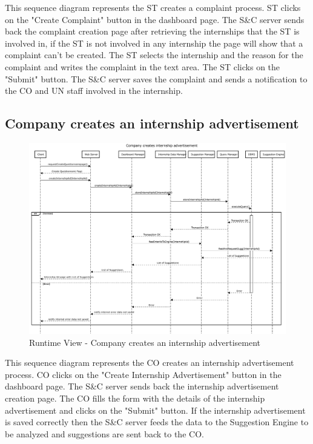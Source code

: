 \par This sequence diagram represents the ST creates a complaint process. ST clicks on the "Create Complaint" button in the
dashboard page. The S\&C server sends back the complaint creation page after retrieving the internships that the ST is involved in, 
if the ST is not involved in any internship the page will show that a complaint can't be created. The ST selects the internship 
and the reason for the complaint and writes the complaint in the text area. The ST clicks on the "Submit" button. The S\&C server
saves the complaint and sends a notification to the CO and UN staff involved in the internship.


\subsection{Company creates an internship advertisement}

\begin{figure}[H]
      \centering
      \includegraphics[width=1.0\textwidth]{Images/RV_06.pdf}
      \caption{Runtime View - Company creates an internship advertisement}
      \label{fig:rv-company-creates-an-internship-advertisement}
\end{figure}

\par This sequence diagram represents the CO creates an internship advertisement process. CO clicks on the "Create Internship
Advertisement" button in the dashboard page. The S\&C server sends back the internship advertisement creation page. The CO fills
the form with the details of the internship advertisement and clicks on the "Submit" button. If the internship advertisement is
saved correctly then the S\&C server feeds the data to the Suggestion Engine to be analyzed and suggestions are sent back to the CO.

